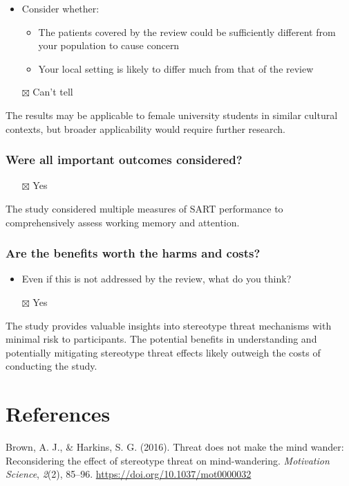 \documentclass[
  doc, a4paper]{apa7}
\providecommand{\tightlist}{%
  \setlength{\itemsep}{0pt}\setlength{\parskip}{0pt}}
\newlength{\cslhangindent}
\newenvironment{CSLReferences}[2] %
 {\begin{list}{}{%
  \setlength{\itemindent}{0pt}
  \setlength{\leftmargin}{0pt}
  \setlength{\parsep}{0pt}
  \ifodd #1
   \setlength{\leftmargin}{\cslhangindent}
   \setlength{\itemindent}{-1\cslhangindent}
  \fi
  \setlength{\itemsep}{#2\baselineskip}}}
 {\end{list}}
\begin{document}
\begin{itemize}
\tightlist
\item
  Consider whether:

  \begin{itemize}
  \tightlist
  \item
    The patients covered by the review could be sufficiently different from your population to cause concern
  \item
    Your local setting is likely to differ much from that of the review
  \end{itemize}
\item[$\boxtimes$]
  Can't tell
\end{itemize}

The results may be applicable to female university students in similar cultural contexts, but broader applicability would require further research.

\subsubsection{Were all important outcomes considered?}\label{were-all-important-outcomes-considered}

\begin{itemize}
\tightlist
\item[$\boxtimes$]
  Yes
\end{itemize}

The study considered multiple measures of SART performance to comprehensively assess working memory and attention.

\subsubsection{Are the benefits worth the harms and costs?}\label{are-the-benefits-worth-the-harms-and-costs}

\begin{itemize}
\tightlist
\item
  Even if this is not addressed by the review, what do you think?
\item[$\boxtimes$]
  Yes
\end{itemize}

The study provides valuable insights into stereotype threat mechanisms with minimal risk to participants. The potential benefits in understanding and potentially mitigating stereotype threat effects likely outweigh the costs of conducting the study.

\section{References}\label{references}

\label{refs}
\begin{CSLReferences}{1}{0}
Brown, A. J., \& Harkins, S. G. (2016). Threat does not make the mind wander: {Reconsidering} the effect of stereotype threat on mind-wandering. \emph{Motivation Science}, \emph{2}(2), 85--96. \url{https://doi.org/10.1037/mot0000032}

\end{CSLReferences}
\end{document}
